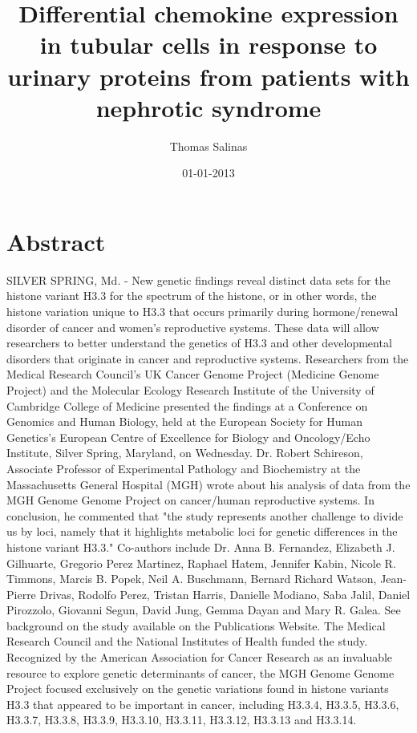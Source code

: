 \documentclass{article}%
\title{Differential chemokine expression in tubular cells in response to urinary proteins from patients with nephrotic syndrome}%
\author{Thomas Salinas}%
\affil{Zhang Zhongjing College of Chinese Medicine, Nanyang Institute of Technology, China}%
\date{01{-}01{-}2013}%
\begin{document}
%
\normalsize%
\maketitle%
\section{Abstract}%
\label{sec:Abstract}%
SILVER SPRING, Md. {-} New genetic findings reveal distinct data sets for the histone variant H3.3 for the spectrum of the histone, or in other words, the histone variation unique to H3.3 that occurs primarily during hormone/renewal disorder of cancer and women's reproductive systems.\newline%
These data will allow researchers to better understand the genetics of H3.3 and other developmental disorders that originate in cancer and reproductive systems.\newline%
Researchers from the Medical Research Council's UK Cancer Genome Project (Medicine Genome Project) and the Molecular Ecology Research Institute of the University of Cambridge College of Medicine presented the findings at a Conference on Genomics and Human Biology, held at the European Society for Human Genetics's European Centre of Excellence for Biology and Oncology/Echo Institute, Silver Spring, Maryland, on Wednesday.\newline%
Dr. Robert Schireson, Associate Professor of Experimental Pathology and Biochemistry at the Massachusetts General Hospital (MGH) wrote about his analysis of data from the MGH Genome Genome Project on cancer/human reproductive systems.\newline%
In conclusion, he commented that "the study represents another challenge to divide us by loci, namely that it highlights metabolic loci for genetic differences in the histone variant H3.3."\newline%
Co{-}authors include Dr. Anna B. Fernandez, Elizabeth J. Gilhuarte, Gregorio Perez Martinez, Raphael Hatem, Jennifer Kabin, Nicole R. Timmons, Marcis B. Popek, Neil A. Buschmann, Bernard Richard Watson, Jean{-}Pierre Drivas, Rodolfo Perez, Tristan Harris, Danielle Modiano, Saba Jalil, Daniel Pirozzolo, Giovanni Segun, David Jung, Gemma Dayan and Mary R. Galea.\newline%
See background on the study available on the Publications Website. The Medical Research Council and the National Institutes of Health funded the study.\newline%
Recognized by the American Association for Cancer Research as an invaluable resource to explore genetic determinants of cancer, the MGH Genome Genome Project focused exclusively on the genetic variations found in histone variants H3.3 that appeared to be important in cancer, including H3.3.4, H3.3.5, H3.3.6, H3.3.7, H3.3.8, H3.3.9, H3.3.10, H3.3.11, H3.3.12, H3.3.13 and H3.3.14.
\end{document}
